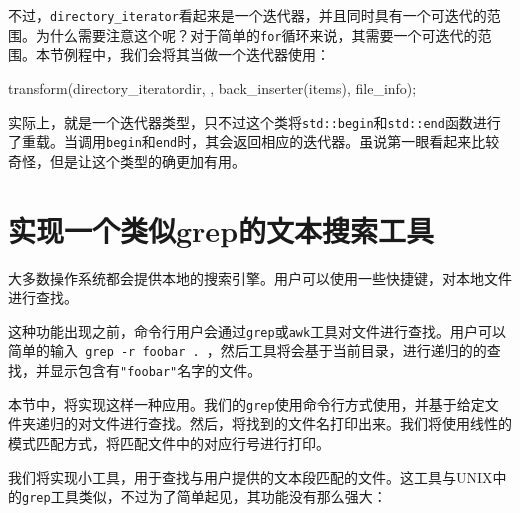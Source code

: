 不过，\texttt{directory\_iterator}看起来是一个迭代器，并且同时具有一个可迭代的范围。为什么需要注意这个呢？对于简单的\texttt{for}循环来说，其需要一个可迭代的范围。本节例程中，我们会将其当做一个迭代器使用：

\begin{codebox}[cpp]
transform(directory_iterator{dir}, {},
         back_inserter(items), file_info);
\end{codebox}

实际上，就是一个迭代器类型，只不过这个类将\texttt{std::begin}和\texttt{std::end}函数进行了重载。当调用\texttt{begin}和\texttt{end}时，其会返回相应的迭代器。虽说第一眼看起来比较奇怪，但是让这个类型的确更加有用。


\section{实现一个类似grep的文本搜索工具}

大多数操作系统都会提供本地的搜索引擎。用户可以使用一些快捷键，对本地文件进行查找。

这种功能出现之前，命令行用户会通过\texttt{grep}或\texttt{awk}工具对文件进行查找。用户可以简单的输入\texttt{ grep -r foobar . }，然后工具将会基于当前目录，进行递归的的查找，并显示包含有\texttt{"foobar"}名字的文件。

本节中，将实现这样一种应用。我们的\texttt{grep}使用命令行方式使用，并基于给定文件夹递归的对文件进行查找。然后，将找到的文件名打印出来。我们将使用线性的模式匹配方式，将匹配文件中的对应行号进行打印。


我们将实现小工具，用于查找与用户提供的文本段匹配的文件。这工具与UNIX中的\texttt{grep}工具类似，不过为了简单起见，其功能没有那么强大：


